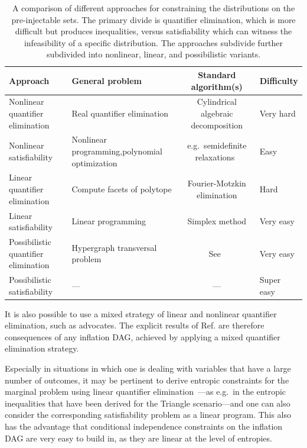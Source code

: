 \begin{asparadesc}
\begin{table}[ht]\centering\caption{A comparison of different approaches for constraining the distributions on the pre-injectable sets. The primary divide is quantifier elimination, which is more difficult but produces inequalities, versus satisfiability which can witness the infeasibility of a specific distribution. The approaches subdivide further subdivided into nonlinear, linear, and possibilistic variants.}
\begin{tabularx}{\linewidth}{ |l|L|c|L| } 
\hline
Approach & General problem & Standard algorithm(s) & Difficulty \\
\bottomrule
Nonlinear quantifier elimination & Real quantifier elimination & Cylindrical algebraic decomposition & Very hard \\
\hline
Nonlinear satisfiability & Nonlinear programming,\newline polynomial optimization & e.g.~semidefinite relaxations~\cite{laurent_polynomial_2012} & Easy \\
\hline
Linear quantifier elimination & Compute facets of polytope & Fourier-Motzkin elimination & Hard \\
\hline
Linear satisfiability & Linear programming & Simplex method & Very easy \\
\hline
Possibilistic quantifier elimination & Hypergraph transversal problem & See~\citet{eiter_dualization_2008} & Very easy \\
\hline 
Possibilistic satisfiability & --- & --- & Super easy
\\\toprule
\end{tabularx}
\end{table}

It is also possible to use a mixed strategy of linear and nonlinear quantifier elimination, such as \citet{ChavesPolynomial} advocates. The explicit results of Ref. \cite{ChavesPolynomial} are therefore consequences of any inflation DAG, achieved by applying a mixed quantifier elimination strategy.

Especially in situations in which one is dealing with variables that have a large number of outcomes, it may be pertinent to derive entropic constraints for the marginal problem using linear quantifier elimination~\cite{fritz2013marginal}---as e.g.~in the entropic inequalities that have been derived for the Triangle scenario---and one can also consider the corresponding satisfiability problem as a linear program. This also has the advantage that conditional independence constraints on the inflation DAG are very easy to build in, as they are linear at the level of entropies.


\end{asparadesc}
